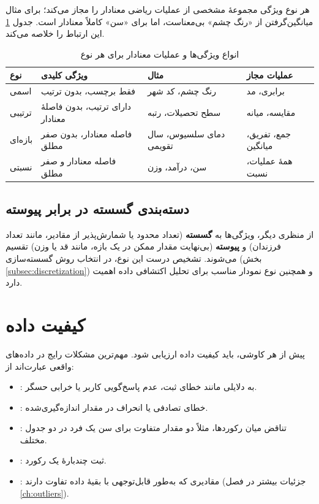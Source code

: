 هر نوع ویژگی مجموعهٔ مشخصی از عملیات ریاضی معنادار را مجاز می‌کند؛ برای مثال
میانگین‌گرفتن از «رنگ چشم» بی‌معناست، اما برای «سن» کاملاً معنادار است. جدول
\ref{tab:attr-types} این ارتباط را خلاصه می‌کند.

\begin{table}[htbp]
\centering
\caption{انواع ویژگی‌ها و عملیات معنادار برای هر نوع}
\label{tab:attr-types}
\begin{tabular}{@{}p{2.0cm}p{3.9cm}p{3.4cm}p{2.7cm}@{}}
\toprule
\textbf{نوع} & \textbf{ویژگی کلیدی} & \textbf{مثال} & \textbf{عملیات مجاز} \\
\midrule
اسمی & فقط برچسب، بدون ترتیب & رنگ چشم، کد شهر & برابری، مد \\
\addlinespace
ترتیبی & دارای ترتیب، بدون فاصلهٔ معنادار & سطح تحصیلات، رتبه & مقایسه، میانه \\
\addlinespace
بازه‌ای & فاصله معنادار، بدون صفر مطلق & دمای سلسیوس، سال تقویمی & جمع، تفریق، میانگین \\
\addlinespace
نسبتی & فاصله معنادار و صفر مطلق & سن، درآمد، وزن & همهٔ عملیات، نسبت \\
\bottomrule
\end{tabular}
\end{table}

\subsection{دسته‌بندی گسسته در برابر پیوسته}

از منظری دیگر، ویژگی‌ها به \textbf{گسسته} (تعداد محدود یا شمارش‌پذیر از
مقادیر، مانند تعداد فرزندان) و \textbf{پیوسته} (بی‌نهایت مقدار ممکن در یک
بازه، مانند قد یا وزن) تقسیم می‌شوند. تشخیص درست این نوع، در انتخاب روش
گسسته‌سازی (بخش \ref{subsec:discretization}) و همچنین نوع نمودار مناسب برای
تحلیل اکتشافی داده اهمیت دارد.

\section{کیفیت داده}
\label{sec:data-quality}

پیش از هر کاوشی، باید کیفیت داده ارزیابی شود. مهم‌ترین مشکلات رایج در داده‌های
واقعی عبارت‌اند از:

\begin{itemize}
    \item {}: به دلایلی مانند خطای ثبت،
          عدم پاسخ‌گویی کاربر یا خرابی حسگر.
    \item {}: خطای تصادفی یا انحراف در مقدار اندازه‌گیری‌شده.
    \item {}: تناقض میان رکوردها،
          مثلاً دو مقدار متفاوت برای سن یک فرد در دو جدول مختلف.
    \item {}: ثبت چندبارهٔ یک رکورد.
    \item {}: مقادیری که به‌طور قابل‌توجهی با
          بقیهٔ داده تفاوت دارند (جزئیات بیشتر در فصل \ref{ch:outliers}).
\end{itemize}

